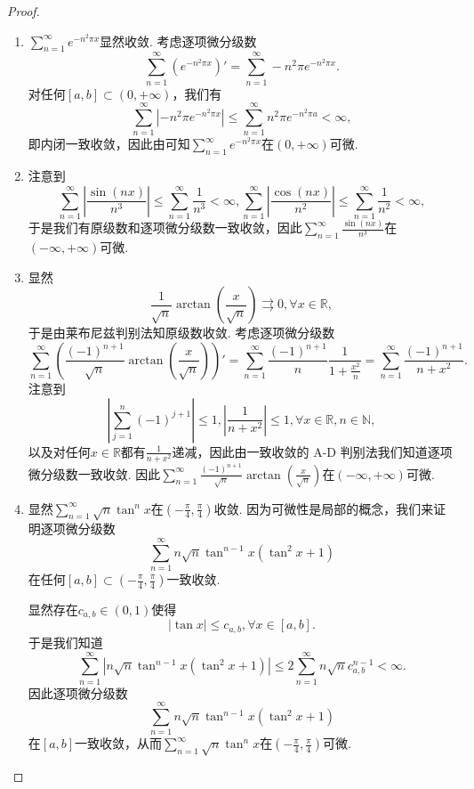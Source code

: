 \documentclass[../../main.tex]{subfiles}
\begin{document}
\begin{proof}
\begin{enumerate}
\item \(\sum_{n=1}^{\infty} e^{-n^2 \pi x}\)显然收敛. 考虑逐项微分级数
\[
\sum_{n=1}^{\infty} \left( e^{-n^2 \pi x} \right)' = \sum_{n=1}^{\infty} -n^2 \pi e^{-n^2 \pi x}.
\]
对任何\([a, b] \subset (0, +\infty)\)，我们有
\[
\sum_{n=1}^{\infty} \left| -n^2 \pi e^{-n^2 \pi x} \right| \leqslant \sum_{n=1}^{\infty} n^2 \pi e^{-n^2 \pi a} < \infty,
\]
即内闭一致收敛，因此由可知\(\sum_{n=1}^{\infty} e^{-n^2 \pi x}\)在\((0, +\infty)\)可微.

\item  注意到
\[
\sum_{n=1}^{\infty} \left| \frac{\sin(nx)}{n^3} \right| \leqslant \sum_{n=1}^{\infty} \frac{1}{n^3} < \infty, \sum_{n=1}^{\infty} \left| \frac{\cos(nx)}{n^2} \right| \leqslant \sum_{n=1}^{\infty} \frac{1}{n^2} < \infty,
\]
于是我们有原级数和逐项微分级数一致收敛，因此\(\sum_{n=1}^{\infty} \frac{\sin(nx)}{n^3}\)在\((-\infty, +\infty)\)可微.

\item 显然
\[
\frac{1}{\sqrt{n}} \arctan \left( \frac{x}{\sqrt{n}} \right) \rightrightarrows 0, \forall x \in \mathbb{R},
\]
于是由莱布尼兹判别法知原级数收敛. 考虑逐项微分级数
\[
\sum_{n=1}^{\infty} \left( \frac{(-1)^{n+1}}{\sqrt{n}} \arctan \left( \frac{x}{\sqrt{n}} \right) \right)' = \sum_{n=1}^{\infty} \frac{(-1)^{n+1}}{n} \frac{1}{1 + \frac{x^2}{n}} = \sum_{n=1}^{\infty} \frac{(-1)^{n+1}}{n + x^2}.
\]
注意到
\[
\left| \sum_{j=1}^{n} (-1)^{j+1} \right| \leqslant 1, \left| \frac{1}{n + x^2} \right| \leqslant 1, \forall x \in \mathbb{R}, n \in \mathbb{N},
\]
以及对任何\(x \in \mathbb{R}\)都有\(\frac{1}{n + x^2}\)递减，因此由一致收敛的 A-D 判别法我们知道逐项微分级数一致收敛. 因此\(\sum_{n=1}^{\infty} \frac{(-1)^{n+1}}{\sqrt{n}} \arctan \left( \frac{x}{\sqrt{n}} \right)\)在\((-\infty, +\infty)\)可微.

\item 显然\(\sum_{n=1}^{\infty} \sqrt{n} \tan^n x\)在\(\left( -\frac{\pi}{4}, \frac{\pi}{4} \right)\)收敛. 因为可微性是局部的概念，我们来证明逐项微分级数
\[
\sum_{n=1}^{\infty} n \sqrt{n} \tan^{n - 1} x \left( \tan^2 x + 1 \right)
\]
在任何\([a, b] \subset \left( -\frac{\pi}{4}, \frac{\pi}{4} \right)\)一致收敛.

显然存在\(c_{a,b} \in (0, 1)\)使得
\[
|\tan x| \leqslant c_{a,b}, \forall x \in [a, b].
\]
于是我们知道
\[
\sum_{n=1}^{\infty} \left| n \sqrt{n} \tan^{n - 1} x \left( \tan^2 x + 1 \right) \right| \leqslant 2 \sum_{n=1}^{\infty} n \sqrt{n} c_{a,b}^{n - 1} < \infty.
\]
因此逐项微分级数
\[
\sum_{n=1}^{\infty} n \sqrt{n} \tan^{n - 1} x \left( \tan^2 x + 1 \right)
\]
在\([a, b]\)一致收敛，从而\(\sum_{n=1}^{\infty} \sqrt{n} \tan^n x\)在\(\left( -\frac{\pi}{4}, \frac{\pi}{4} \right)\)可微.
\end{enumerate}
\end{proof}
\end{document}
